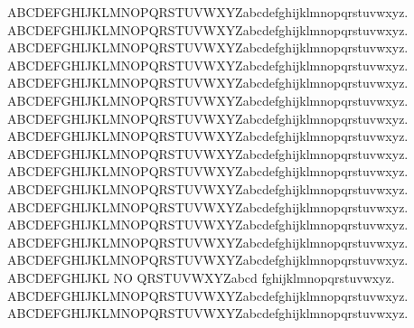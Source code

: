 \multirm  ABCDEFGHIJKLMNOPQRSTUVWXYZabcdefghijklmnopqrstuvwxyz.
\multiol  ABCDEFGHIJKLMNOPQRSTUVWXYZabcdefghijklmnopqrstuvwxyz.
\multitR   ABCDEFGHIJKLMNOPQRSTUVWXYZabcdefghijklmnopqrstuvwxyz.
\multitd   ABCDEFGHIJKLMNOPQRSTUVWXYZabcdefghijklmnopqrstuvwxyz.
\multitset ABCDEFGHIJKLMNOPQRSTUVWXYZabcdefghijklmnopqrstuvwxyz.
\multitM   ABCDEFGHIJKLMNOPQRSTUVWXYZabcdefghijklmnopqrstuvwxyz.
\multibaM   ABCDEFGHIJKLMNOPQRSTUVWXYZabcdefghijklmnopqrstuvwxyz.
\multitrM   ABCDEFGHIJKLMNOPQRSTUVWXYZabcdefghijklmnopqrstuvwxyz.
\multimc   ABCDEFGHIJKLMNOPQRSTUVWXYZabcdefghijklmnopqrstuvwxyz.
\multiop   ABCDEFGHIJKLMNOPQRSTUVWXYZabcdefghijklmnopqrstuvwxyz.
\multids   ABCDEFGHIJKLMNOPQRSTUVWXYZabcdefghijklmnopqrstuvwxyz.
\multiset  ABCDEFGHIJKLMNOPQRSTUVWXYZabcdefghijklmnopqrstuvwxyz.
\multirsfs ABCDEFGHIJKLMNOPQRSTUVWXYZabcdefghijklmnopqrstuvwxyz.
\multipz   ABCDEFGHIJKLMNOPQRSTUVWXYZabcdefghijklmnopqrstuvwxyz.
\multiM    ABCDEFGHIJKLMNOPQRSTUVWXYZabcdefghijklmnopqrstuvwxyz.
\multiR    ABCDEFGHIJKL NO QRSTUVWXYZabcd fghijklmnopqrstuvwxyz.
\multibb   ABCDEFGHIJKLMNOPQRSTUVWXYZabcdefghijklmnopqrstuvwxyz.
\multiRM   ABCDEFGHIJKLMNOPQRSTUVWXYZabcdefghijklmnopqrstuvwxyz.
\newcommand{\RRM}{\R{M}}
\newcommand{\RRP}{\R{P}}
\newcommand{\RRe}{\R{e}}
\newcommand{\RRS}{\R{S}}

\newcommand{\dotleq}{\buildrel \textstyle  .\over {\smash{\lower
      .2ex\hbox{\ensuremath\leqslant}}\vphantom{=}}}
\newcommand{\dotgeq}{\buildrel \textstyle  .\over {\smash{\lower
      .2ex\hbox{\ensuremath\geqslant}}\vphantom{=}}}

\DeclareMathOperator*{\argmin}{arg\,min}
\DeclareMathOperator*{\argmax}{arg\,max}


\newcommand{\esm}{\ensuremath}

\newcommand{\bM}{\begin{bmatrix}}
\newcommand{\eM}{\end{bmatrix}}
\newcommand{\bSM}{\left[\begin{smallmatrix}}
\newcommand{\eSM}{\end{smallmatrix}\right]}
\renewcommand*\env@matrix[1][*\c@MaxMatrixCols c]{%
  \hskip -\arraycolsep
  \let\@ifnextchar\new@ifnextchar
  \array{#1}}




